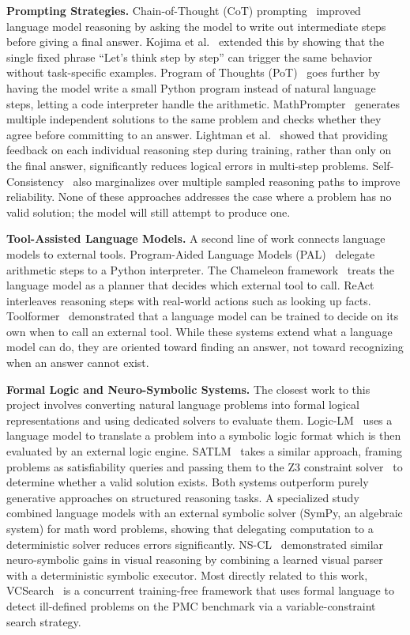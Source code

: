 \documentclass[sigconf, nonacm, onecolumn]{acmart}
\begin{document}
\textbf{Prompting Strategies.} Chain-of-Thought (CoT)
prompting~\cite{wei2022} improved language model reasoning by asking the
model to write out intermediate steps before giving a final answer. Kojima et
al.~\cite{kojima2022} extended this by showing that the single fixed phrase
``Let's think step by step'' can trigger the same behavior without
task-specific examples. Program of Thoughts (PoT)~\cite{chen2023} goes
further by having the model write a small Python program instead of natural
language steps, letting a code interpreter handle the arithmetic.
MathPrompter~\cite{imani2023} generates multiple independent solutions to the
same problem and checks whether they agree before committing to an answer.
Lightman et al.~\cite{lightman2024} showed that providing feedback on each
individual reasoning step during training, rather than only on the final
answer, significantly reduces logical errors in multi-step problems.
Self-Consistency~\cite{wang2023sc} also marginalizes over multiple sampled
reasoning paths to improve reliability. None of these approaches addresses
the case where a problem has no valid solution; the model will still attempt
to produce one.

\textbf{Tool-Assisted Language Models.} A second line of work connects
language models to external tools. Program-Aided Language Models
(PAL)~\cite{gao2023} delegate arithmetic steps to a Python interpreter. The
Chameleon framework~\cite{lu2023} treats the language model as a planner
that decides which external tool to call. ReAct~\cite{yao2023} interleaves
reasoning steps with real-world actions such as looking up facts.
Toolformer~\cite{schick2023} demonstrated that a language model can be
trained to decide on its own when to call an external tool. While these
systems extend what a language model can do, they are oriented toward
finding an answer, not toward recognizing when an answer cannot exist.

\textbf{Formal Logic and Neuro-Symbolic Systems.} The closest work to this
project involves converting natural language problems into formal logical
representations and using dedicated solvers to evaluate them.
Logic-LM~\cite{pan2023} uses a language model to translate a problem into a
symbolic logic format which is then evaluated by an external logic engine.
SATLM~\cite{ye2023} takes a similar approach, framing problems as
satisfiability queries and passing them to the Z3 constraint
solver~\cite{demoura2008} to determine whether a valid solution exists. Both
systems outperform purely generative approaches on structured reasoning
tasks. A specialized study~\cite{heyueya2023} combined language models with
an external symbolic solver (SymPy, an algebraic system) for math word
problems, showing that delegating computation to a deterministic solver
reduces errors significantly. NS-CL~\cite{mao2019} demonstrated similar
neuro-symbolic gains in visual reasoning by combining a learned visual
parser with a deterministic symbolic executor. Most directly related to this
work, VCSearch~\cite{zhou2024} is a concurrent training-free framework that
uses formal language to detect ill-defined problems on the PMC benchmark via
a variable-constraint search strategy.
\end{document}
